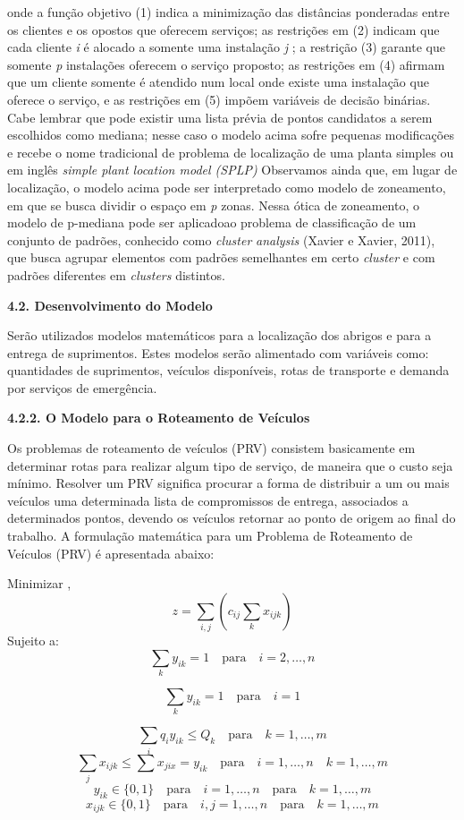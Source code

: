 \documentclass[
]{article}
\begin{document}
onde a função objetivo (1) indica a minimização das distâncias
ponderadas entre os clientes e os opostos que oferecem serviços; as
restrições em (2) indicam que cada cliente \emph{i} é alocado a somente
uma instalação \emph{j} ; a restrição (3) garante que somente \emph{p}
instalações oferecem o serviço proposto; as restrições em (4) afirmam
que um cliente somente é atendido num local onde existe uma instalação
que oferece o serviço, e as restrições em (5) impõem variáveis de
decisão binárias. Cabe lembrar que pode existir uma lista prévia de
pontos candidatos a serem escolhidos como mediana; nesse caso o modelo
acima sofre pequenas modificações e recebe o nome tradicional de
problema de localização de uma planta simples ou em inglês \emph{simple
plant location model (SPLP)} Observamos ainda que, em lugar de
localização, o modelo acima pode ser interpretado como modelo de
zoneamento, em que se busca dividir o espaço em \emph{p} zonas. Nessa
ótica de zoneamento, o modelo de p-mediana pode ser aplicadoao problema
de classificação de um conjunto de padrões, conhecido como
\emph{cluster} \emph{analysis} (Xavier e Xavier, 2011), que busca
agrupar elementos com padrões semelhantes em certo \emph{cluster} e com
padrões diferentes em \emph{clusters} distintos.

\textbf{4.2. Desenvolvimento do Modelo}

Serão utilizados modelos matemáticos para a localização dos abrigos e
para a entrega de suprimentos. Estes modelos serão alimentado com
variáveis como: quantidades de suprimentos, veículos disponíveis, rotas
de transporte e demanda por serviços de emergência.

\textbf{4.2.2. O Modelo para o Roteamento de Veículos}

Os problemas de roteamento de veículos (PRV) consistem basicamente em
determinar rotas para realizar algum tipo de serviço, de maneira que o
custo seja mínimo. Resolver um PRV significa procurar a forma de
distribuir a um ou mais veículos uma determinada lista de compromissos
de entrega, associados a determinados pontos, devendo os veículos
retornar ao ponto de origem ao final do trabalho. A formulação
matemática para um Problema de Roteamento de Veículos (PRV) é
apresentada abaixo:

Minimizar , \[z=\sum_{i,j}(c_{ij}\sum_{k}x_{ijk})\] Sujeito a:
\[\sum_{k}y_{ik}=1 \quad \text{para} \quad  i=2, \dots,n\]

\[\sum_{k}y_{ik}=1\quad \text{para} \quad  i=1\]

\[\sum_{i}q_{i}y_{ik} \leq Q_{k} \quad \text{para} \quad  k=1, \dots,m\]
\[\sum_{j}x_{ijk} \leq\sum x_{jix}=y_{ik} \quad \text{para}\quad i=1,\dots,n\quad k=1,\dots,m\]
\[y_{ik} \in \{0,1\}\quad\text{para}\quad i=1,\dots,n\quad\text{para}\quad k=1,\dots,m\]
\[x_{ijk} \in \{0,1\}\quad\text{para}\quad i,j=1,\dots,n\quad\text{para}\quad k=1,\dots,m\]
\end{document}
